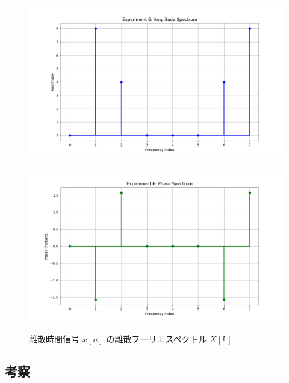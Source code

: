 \documentclass[fleqn, a4paper. 12pt]{jsarticle}
\begin{document}
  \begin{figure}[h]
    \begin{center}
    \begin{minipage}[t]{0.48\columnwidth}
        \includegraphics[width=\columnwidth]{amplitude_spectrum_experiment_6.png}
        \label{fign:a6}
    \end{minipage}
    \begin{minipage}[t]{0.48\columnwidth}
        \includegraphics[width=\columnwidth]{phase_spectrum_experiment_6.png}
        \label{fign:p6}
    \end{minipage}
    \end{center}
    \caption{離散時間信号 $x[n]$ の離散フーリエスペクトル $X[k]$}
  \end{figure}

  \subsection*{考察}
\end{document}
